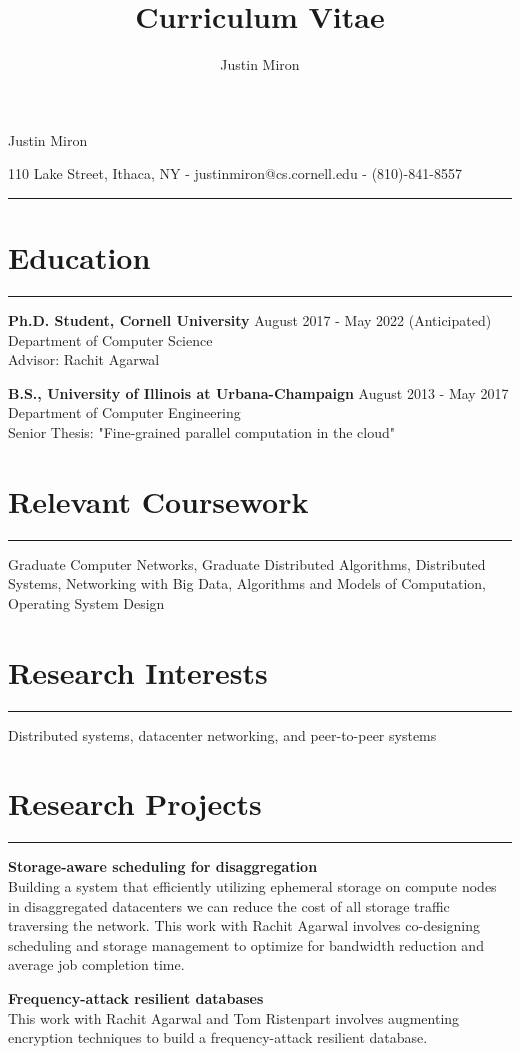 \documentclass[10pt]{article}
\title{Curriculum Vitae}
\author{Justin Miron}
\makeatletter
\newcommand{\Hrule}{\par\rule{\linewidth}{0.3mm}}
\newcommand{\leftrightrow}[2]{
	#1 \hfill #2 \\
}
\newcommand{\titlesection}{
\parindent=0pt
\setlength{\parskip}{0.1em}
\par{\LARGE Justin Miron}
\par{110 Lake Street, Ithaca, NY -  justinmiron@cs.cornell.edu - (810)-841-8557}
\vspace{-0.5em}
\Hrule
}
\newcommand{\researchblock}[3]{
	\leftrightrow{\textbf{#1}}{#2}#3
}
\newcommand{\educationblock}[3]{
	\leftrightrow{\textbf{#1}}{#2}
    #3 \\
}
\makeatother
\begin{document}
\titlesection
\setlength{\parskip}{0em}

\section{Education}
\hrule \vspace{0.4em} 
\educationblock{Ph.D. Student, Cornell University}{August 2017 - May 2022 (Anticipated)}{Department of Computer Science}
Advisor: Rachit Agarwal
\vspace{0.5em}

\educationblock{B.S., University of Illinois at Urbana-Champaign}{August 2013 - May 2017}{Department of Computer Engineering}
Senior Thesis: "Fine-grained parallel computation in the cloud"

\section{Relevant Coursework}
\hrule \vspace{0.4em}
Graduate Computer Networks, Graduate Distributed Algorithms, Distributed Systems, Networking with Big Data, Algorithms and Models of Computation, Operating System Design

\section{Research Interests}
\hrule \vspace{0.4em}
Distributed systems, datacenter networking, and peer-to-peer systems

\section{Research Projects}
\hrule \vspace{0.4em}
\researchblock{Storage-aware scheduling for disaggregation}{}
{
	Building a system that efficiently utilizing ephemeral storage on compute nodes in disaggregated datacenters we can reduce the cost of all storage traffic traversing the network. This work with Rachit Agarwal involves co-designing scheduling and storage management to optimize for bandwidth reduction and average job completion time.
}

\vspace{0.6em}

\researchblock{Frequency-attack resilient databases}{}
{
	This work with Rachit Agarwal and Tom Ristenpart involves augmenting encryption techniques to build a frequency-attack resilient database.
}
\end{document}
